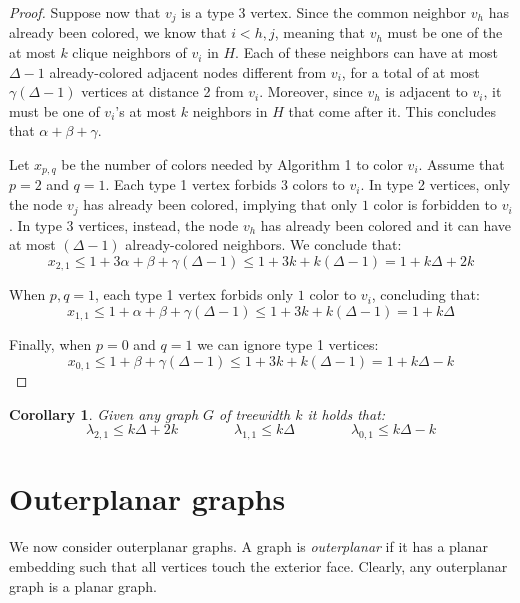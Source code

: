\documentclass[12pt,a4paper]{article}
\newtheorem{corollary}{Corollary}
\begin{document}
\begin{proof}
		Suppose now that $v_j$ is a type 3 vertex. Since the common neighbor $v_h$ has already been colored, we know that $i < h, j$, meaning that $v_h$ must be one of the at most $k$ clique neighbors of $v_i$ in $H$. Each of these neighbors can have at most $\Delta-1$ already-colored adjacent nodes different from $v_i$, for a total of at most $\gamma(\Delta-1)$ vertices at distance 2 from $v_i$. Moreover, since $v_h$ is adjacent to $v_i$, it must be one of $v_i$'s at most $k$ neighbors in $H$ that come after it. This concludes that $\alpha + \beta + \gamma$.
		
		Let $x_{p,q}$ be the number of colors needed by Algorithm 1 to color $v_i$. Assume that $p = 2$ and $q = 1$. Each type 1 vertex forbids $3$ colors to $v_i$. In type 2 vertices, only the node $v_j$ has already been colored, implying that only $1$ color is forbidden to $v_i$. In type 3 vertices, instead, the node $v_h$ has already been colored and it can have at most $(\Delta-1)$ already-colored neighbors. We conclude that:
		\[x_{2,1} \leq 1+ 3\alpha + \beta + \gamma(\Delta-1) \leq 1+ 3k + k(\Delta-1) = 1+k\Delta + 2k\]

		When $p,q = 1$, each type 1 vertex forbids only $1$ color to $v_i$, concluding that:
		\[x_{1,1} \leq 1+ \alpha + \beta + \gamma(\Delta-1) \leq 1+3k + k(\Delta-1) = 1+k\Delta\]

		Finally, when $p = 0$ and $q = 1$ we can ignore type 1 vertices:
		\[x_{0,1} \leq 1 + \beta + \gamma(\Delta-1) \leq 1+3k + k(\Delta-1) = 1+k\Delta -k\]
	\end{proof}

	\begin{corollary}
		Given any graph $G$ of treewidth $k$ it holds that:
    	\[\lambda_{2,1} \leq k\Delta+2k \qquad\qquad \lambda_{1,1} \leq k\Delta \qquad\qquad \lambda_{0,1} \leq k\Delta-k\]
	\end{corollary}

	\section{Outerplanar graphs}

	We now consider outerplanar graphs. A graph is \textit{outerplanar} if it has a planar embedding such that all vertices touch the exterior face. Clearly, any outerplanar graph is a planar graph.
\end{document}
